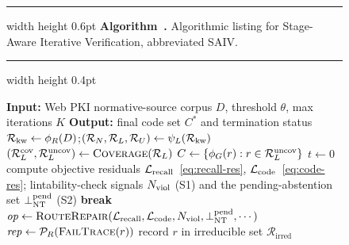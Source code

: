 %
\begin{figure}[tb]
\setlength{\parskip}{0pt}
\makeatletter
{}%
\makeatother
{}
\label{alg:saiv}
\hrule width \linewidth height 0.6pt\relax
\vspace{1pt}
\nointerlineskip
\noindent\textbf{Algorithm~\thealgorithm.} Algorithmic listing for
Stage-Aware Iterative Verification, abbreviated SAIV.
\par
\vspace{1pt}
\nointerlineskip
\hrule width \linewidth height 0.4pt\relax
\nointerlineskip
\scriptsize
\begin{algorithmic}[1]
\Statex \textbf{Input:} Web PKI normative-source corpus $D$, threshold $\theta$, max iterations $K$
\Statex \textbf{Output:} final code set $C^{*}$ and termination status
\State $\mathcal{R}_{\mathrm{kw}} \gets \phi_R(D)$;\quad $(\mathcal{R}_N,\mathcal{R}_L,\mathcal{R}_U)\gets \psi_L(\mathcal{R}_{\mathrm{kw}})$
\State $(\mathcal{R}_L^{\mathrm{cov}},\mathcal{R}_L^{\mathrm{uncov}})\gets \textsc{Coverage}(\mathcal{R}_L)$
\State $C \gets \{\phi_G(r): r\in \mathcal{R}_L^{\mathrm{uncov}}\}$
\State $t\gets 0$
\Repeat
  \State compute objective residuals $\mathcal{L}_{\mathrm{recall}}$~\eqref{eq:recall-res},
    $\mathcal{L}_{\mathrm{code}}$~\eqref{eq:code-res}; lintability-check signals $N_{\mathrm{viol}}$ (S1) and the
    pending-abstention set $\bot_{\mathrm{NT}}^{\mathrm{pend}}$ (S2)
    \State \textbf{break} 
  \EndIf
  \State $\mathit{op}\gets \textsc{RouteRepair}(\mathcal{L}_{\mathrm{recall}},\mathcal{L}_{\mathrm{code}},N_{\mathrm{viol}},\bot_{\mathrm{NT}}^{\mathrm{pend}},\cdots)$
  \Statex {}
   
      \State $\mathit{rep}\gets \mathcal{P}_R(\textsc{FailTrace}(r))$
        \State record $r$ in irreducible set $\mathcal{R}_{\mathrm{irred}}$

\end{algorithmic}
\end{figure}
